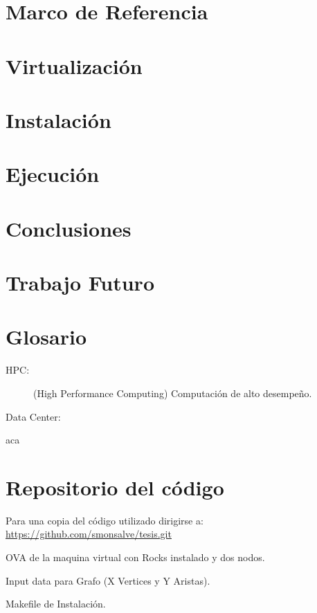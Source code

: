 \documentclass[twoside,letterpaper,12pt]{report}
\begin{document}
\chapter{Marco de Referencia}\label{ChapRef}


\chapter{Virtualización}


\chapter{Instalación}


\chapter{Ejecución}


\chapter{Conclusiones}


\chapter{Trabajo Futuro}


\chapter{Glosario}
	\label{chapGlosario}

	\begin{description}
		\item[HPC:] (High Performance Computing) Computación de alto desempeño.
		\item[Data Center:]
	\end{description}

\newpage



	
	aca
	\cite{czarnecki2000generative}
	\cite{wwwBoost}
	\cite{stroustrup2013c++}
	\cite{andrei2001modern}
	\cite{Wall2000}
	\cite{Boost}
	\cite{Karniadakis}
	\cite{Kernighan1988}

\newpage

\appendix

\chapter{Repositorio del código}

	Para una copia del código utilizado dirigirse a: \url{https://github.com/smonsalve/tesis.git}

	OVA de la maquina virtual con Rocks instalado y dos nodos.

	Input data para Grafo (X Vertices y Y Aristas).

	Makefile de Instalación.
\end{document}
